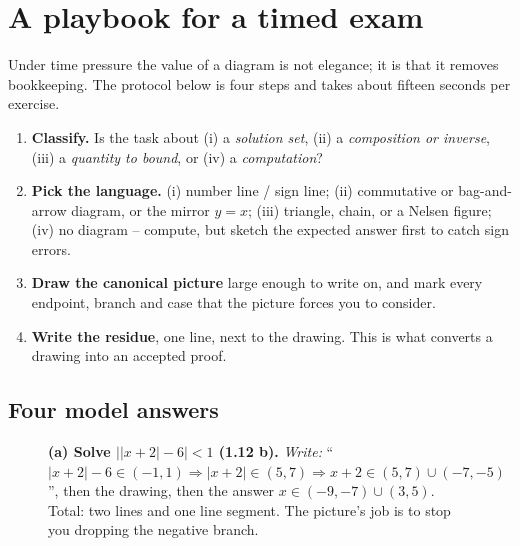 \section{A playbook for a timed exam}
\label{sec:exam}

Under time pressure the value of a diagram is not elegance; it is that it removes
bookkeeping. The protocol below is four steps and takes about fifteen seconds per
exercise.

\begin{recipe}
\begin{enumerate}[leftmargin=1.6em,itemsep=1pt]
\item \textbf{Classify.} Is the task about (i) a \emph{solution set}, (ii) a
  \emph{composition or inverse}, (iii) a \emph{quantity to bound}, or (iv) a
  \emph{computation}?
\item \textbf{Pick the language.} (i) number line / sign line; (ii) commutative or
  bag-and-arrow diagram, or the mirror $y=x$; (iii) triangle, chain, or a Nelsen figure;
  (iv) no diagram -- compute, but sketch the expected answer first to catch sign errors.
\item \textbf{Draw the canonical picture} large enough to write on, and mark every
  endpoint, branch and case that the picture forces you to consider.
\item \textbf{Write the residue}, one line, next to the drawing. This is what converts a
  drawing into an accepted proof.
\end{enumerate}
\end{recipe}

\subsection{Four model answers}

\begin{figure}[H]
\centering
{}
\caption*{\textbf{(a) Solve $\bigl||x+2|-6\bigr|<1$ (1.12 b).} \emph{Write:}
``$|x+2|-6\in(-1,1)\Rightarrow|x+2|\in(5,7)\Rightarrow x+2\in(5,7)\cup(-7,-5)$'', then
the drawing, then the answer $x\in(-9,-7)\cup(3,5)$. Total: two lines and one line
segment. The picture's job is to stop you dropping the negative branch.}
\end{figure}

